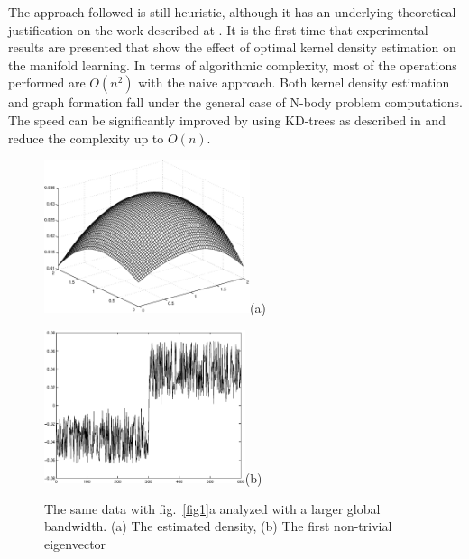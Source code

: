 \documentclass[12pt,letterpaper,doublespaced,ETD,dvips,proposal]{gtthesis}
\begin{document}
\begin{Body}
The approach followed is still  heuristic, although it has  an
underlying theoretical justification on the work described at
\cite{jenssen17lpd}. It is the first time that experimental results
are presented that show the effect of optimal kernel density
estimation on the manifold learning.
 In terms of algorithmic
complexity, most of the operations performed are $O(n^2)$ with the
naive approach. Both kernel density estimation and graph formation
fall under the general case of N-body problem computations. The
speed can be significantly improved by using KD-trees as described
in \cite{gray2001nbp} and reduce the complexity up to $O(n)$.


\begin{figure}[!htb]
  \centerline{\includegraphics[height=4.5cm]{fig1.1b.eps}(a)}
  \centerline{\includegraphics[height=4.5cm]{fig1.1c.eps}(b)}
  \caption{The same data with fig.~\ref{fig1}a analyzed with a
  larger global bandwidth. (a) The estimated density, (b) The first
  non-trivial eigenvector }
  \label{fig1.1}
\end{figure}



\end{Body}
\end{document}
